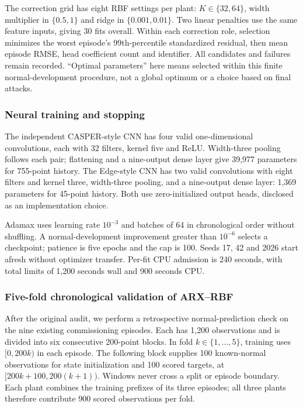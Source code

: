 The correction grid has eight RBF settings per plant: $K\in\{32,64\}$, width multiplier in $\{0.5,1\}$ and ridge in $\{0.001,0.01\}$. Two linear penalties use the same feature inputs, giving 30 fits overall. Within each correction role, selection minimizes the worst episode's 99th-percentile standardized residual, then mean episode RMSE, head coefficient count and identifier. All candidates and failures remain recorded. ``Optimal parameters'' here means selected within this finite normal-development procedure, not a global optimum or a choice based on final attacks.

\subsubsection{Neural training and stopping}
The independent CASPER-style CNN has four valid one-dimensional convolutions, each with 32 filters, kernel five and ReLU. Width-three pooling follows each pair; flattening and a nine-output dense layer give 39,977 parameters for 755-point history. The Edge-style CNN has two valid convolutions with eight filters and kernel three, width-three pooling, and a nine-output dense layer: 1,369 parameters for 45-point history. Both use zero-initialized output heads, disclosed as an implementation choice.

Adamax uses learning rate $10^{-3}$ and batches of 64 in chronological order without shuffling. A normal-development improvement greater than $10^{-6}$ selects a checkpoint; patience is five epochs and the cap is 100. Seeds 17, 42 and 2026 start afresh without optimizer transfer. Per-fit CPU admission is 240 seconds, with total limits of 1,200 seconds wall and 900 seconds CPU.

\subsubsection{Five-fold chronological validation of ARX--RBF}
After the original audit, we perform a retrospective normal-prediction check on the nine existing commissioning episodes. Each has 1,200 observations and is divided into six consecutive 200-point blocks. In fold $k\in\{1,\ldots,5\}$, training uses $[0,200k)$ in each episode. The following block supplies 100 known-normal observations for state initialization and 100 scored targets, at $[200k+100,200(k+1))$. Windows never cross a split or episode boundary. Each plant combines the training prefixes of its three episodes; all three plants therefore contribute 900 scored observations per fold.

